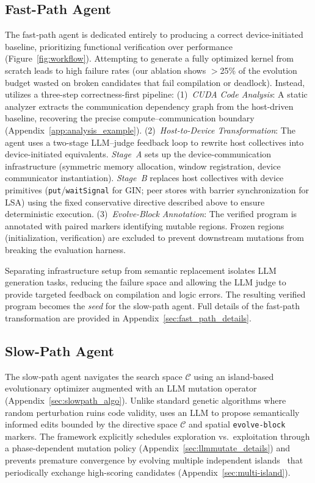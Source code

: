 \subsection{Fast-Path Agent}
\vspace{-8pt}
\label{fast_path}
The fast‑path agent is dedicated entirely to producing a correct device-initiated baseline, prioritizing functional verification over performance (Figure~\ref{fig:workflow}). Attempting to generate a fully optimized kernel from scratch leads to high failure rates (our ablation shows $>$25\% of the evolution budget wasted on broken candidates that fail compilation or deadlock). Instead, \cufuse{} utilizes a three-step correctness-first pipeline: (1)~\emph{CUDA Code Analysis}: A static analyzer extracts the communication dependency graph from the host-driven baseline, recovering the precise compute--communication boundary (Appendix~\ref{app:analysis_example}). (2)~\emph{Host-to-Device Transformation}: The agent uses a two-stage LLM--judge feedback loop to rewrite host collectives into device-initiated equivalents. \emph{Stage~A} sets up the device-communication infrastructure (symmetric memory allocation, window registration, device communicator instantiation). \emph{Stage~B} replaces host collectives with device primitives (\texttt{put}/\texttt{waitSignal} for GIN; peer stores with barrier synchronization for LSA) using the fixed conservative directive described above to ensure deterministic execution. (3)~\emph{Evolve-Block Annotation}: The verified program is annotated with paired markers identifying mutable regions. Frozen regions (initialization, verification) are excluded to prevent downstream mutations from breaking the evaluation harness.

Separating infrastructure setup from semantic replacement isolates LLM generation tasks, reducing the failure space and allowing the LLM judge to provide targeted feedback on compilation and logic errors. The resulting verified program becomes the \emph{seed} for the slow-path agent. Full details of the fast-path transformation are provided in Appendix~\ref{sec:fast_path_details}.


\vspace{-10pt}
\subsection{Slow-Path Agent}
\vspace{-10pt}
\label{subsec:slow_path}


The slow‑path agent navigates the search space $\mathcal{C}$ using an island‑based evolutionary optimizer augmented with an LLM mutation operator (Appendix~\ref{sec:slowpath_algo}). Unlike standard genetic algorithms where random perturbation ruins code validity, \cufuse{} uses an LLM to propose semantically informed edits bounded by the directive space $\mathcal{C}$ and spatial \texttt{evolve-block} markers. The framework explicitly schedules exploration vs.\ exploitation through a phase-dependent mutation policy (Appendix~\ref{sec:llmmutate_details}) and prevents premature convergence by evolving multiple independent islands~\cite{lange2025shinkaevolveopenendedsampleefficientprogram} that periodically exchange high-scoring candidates (Appendix~\ref{sec:multi-island}).


